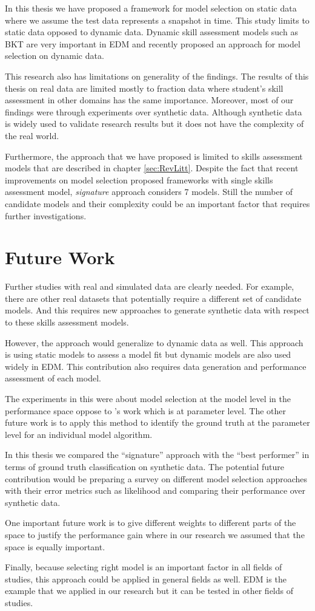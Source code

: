 In this thesis we have proposed a framework for model selection on static data where we assume the test data represents a snapshot in time. This study limits to static data opposed to dynamic data. Dynamic skill assessment models such as BKT are very important in EDM and recently \citet{Rosenberg2015} proposed an approach for model selection on dynamic data. 

This research also has limitations on generality of the findings. The results of this thesis on real data are limited mostly to fraction data where student's skill assessment in other domains has the same importance. Moreover, most of our findings were through experiments over synthetic data. Although synthetic data is widely used to validate research results but it does not have the complexity of the real world. 

Furthermore, the approach that we have proposed is limited to skills assessment models that are described in chapter \ref{sec:RevLitt}. Despite the fact that recent improvements on model selection proposed frameworks with single skills assessment model, \textit{signature} approach considers 7 models. Still the number of candidate models and their complexity could be an important factor that requires further investigations.

\section{Future Work}

Further studies with real and simulated data are clearly needed. For example, there are other real datasets that potentially require a different set of candidate models. And this requires new approaches to generate synthetic data with respect to these skills assessment models.

However, the approach would generalize to dynamic data as well. This approach is using static models to assess a model fit but dynamic models are also used widely in EDM. This contribution also requires data generation and performance assessment of each model.

The experiments in this were about model selection at the model level in the performance space oppose to \citet{Rosenberg2015}'s work which is at parameter level. The other future work is to apply this method to identify the ground truth at the parameter level for an individual model algorithm.

In this thesis we compared the ``signature'' approach with the ``best performer'' in terms of ground truth classification on synthetic data. The potential future contribution would be preparing a survey on different model selection approaches with their error metrics such as likelihood and comparing their performance over synthetic data.

One important future work is to give different weights to different parts of the space to justify the performance gain where in our research we assumed that the space is equally important.

Finally, because selecting right model is an important factor in all fields of studies, this approach could be applied in general fields as well. EDM is the example that we applied in our research but it can be tested in other fields of studies.
